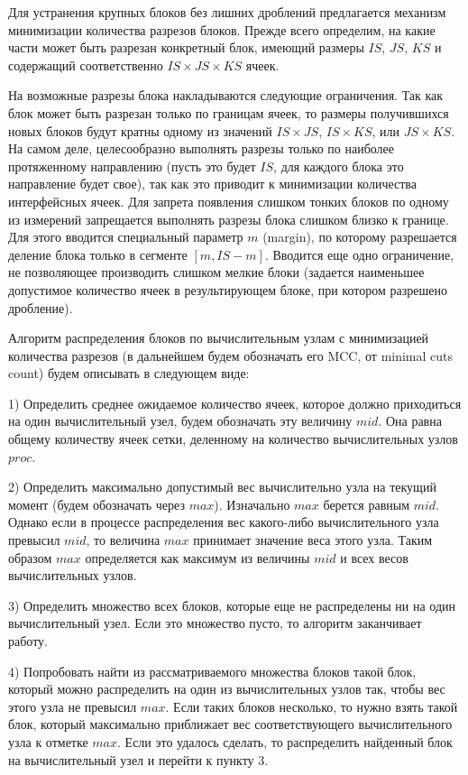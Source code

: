 Для устранения крупных блоков без лишних дроблений предлагается механизм минимизации количества разрезов блоков.
Прежде всего определим, на какие части может быть разрезан конкретный блок, имеющий размеры $IS$, $JS$, $KS$ и содержащий соответственно $IS \times JS \times KS$ ячеек.

На возможные разрезы блока накладываются следующие ограничения.
Так как блок может быть разрезан только по границам ячеек, то размеры получившихся новых блоков будут кратны одному из значений $IS \times JS$, $IS \times KS$, или $JS \times KS$.
На самом деле, целесообразно выполнять разрезы только по наиболее протяженному направлению (пусть это будет $IS$, для каждого блока это направление будет свое), так как это приводит к минимизации количества интерфейсных ячеек.
Для запрета появления слишком тонких блоков по одному из измерений запрещается выполнять разрезы блока слишком близко к границе.
Для этого вводится специальный параметр $m$ (margin), по которому разрешается деление блока только в сегменте $[m, IS - m]$.
Вводится еще одно ограничение, не позволяющее производить слишком мелкие блоки (задается наименьшее допустимое количество ячеек в результирующем блоке, при котором разрешено дробление).

Алгоритм распределения блоков по вычислительным узлам с минимизацией количества разрезов (в дальнейшем будем обозначать его MCC, от minimal cuts count\label{abbr:mcc}) будем описывать в следующем виде:

1) Определить среднее ожидаемое количество ячеек, которое должно приходиться на один вычислительный узел, будем обозначать эту величину $mid$.
Она равна общему количеству ячеек сетки, деленному на количество вычислительных узлов $proc$.

2) Определить максимально допустимый вес вычислительно узла на текущий момент (будем обозначать через $max$).
Изначально $max$ берется равным $mid$.
Однако если в процессе распределения вес какого-либо вычислительного узла превысил $mid$, то величина $max$ принимает значение веса этого узла.
Таким образом $max$ определяется как максимум из величины $mid$ и всех весов вычислительных узлов.

3) Определить множество всех блоков, которые еще не распределены ни на один вычислительный узел.
Если это множество пусто, то алгоритм заканчивает работу.

4) Попробовать найти из рассматриваемого множества блоков такой блок, который можно распределить на один из вычислительных узлов так, чтобы вес этого узла не превысил $max$.
Если таких блоков несколько, то нужно взять такой блок, который максимально приближает вес соответствующего вычислительного узла к отметке $max$.
Если это удалось сделать, то распределить найденный блок на вычислительный узел и перейти к пункту 3.

